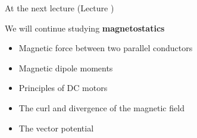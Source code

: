 \begin{frame}{At the next lecture (Lecture \nextlecture)}

We will continue studying {\bf magnetostatics}

\begin{itemize}
  \item Magnetic force between  two parallel conductors
  \item Magnetic dipole moments
  \item Principles of DC motors
  \item The curl and divergence of the magnetic field
  \item The vector potential
\end{itemize}

\end{frame}

%
%



